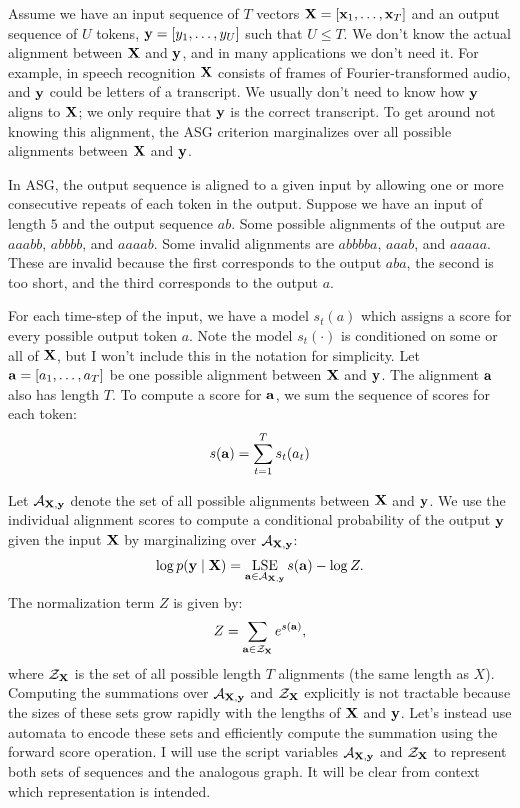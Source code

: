 Assume we have an input sequence of $T$ vectors ${\bf X} = [{\bf x}_1, \ldots, {\bf x}_T]$
and an output sequence of $U$ tokens, ${\bf y} = [y_1, \ldots, y_U]$ such that $U
\le T$. We don't know the actual alignment between ${\bf X}$ and ${\bf y}$, and in many
applications we don't need it. For example, in speech recognition ${\bf X}$
consists of frames of Fourier-transformed audio, and ${\bf y}$ could be letters of
a transcript. We usually don't need to know how ${\bf y}$ aligns to ${\bf X}$; we only
require that ${\bf y}$ is the correct transcript. To get around not knowing this
alignment, the ASG criterion marginalizes over all possible alignments between
${\bf X}$ and ${\bf y}$.

In ASG, the output sequence is aligned to a given input by allowing one or more
consecutive repeats of each token in the output. Suppose we have an input of
length $5$ and the output sequence $ab$. Some possible alignments of the output
are $aaabb$, $abbbb$, and $aaaab$. Some invalid alignments are $abbbba$, $aaab$,
and $aaaaa$. These are invalid because the first corresponds to the output
$aba$, the second is too short, and the third corresponds to the output $a$.

For each time-step of the input, we have a model $s_t(a)$ which assigns a score
for every possible output token $a$. Note the model $s_t(\cdot)$ is conditioned
on some or all of ${\bf X}$, but I won't include this in the notation for
simplicity. Let ${\bf a} = [a_1, \ldots, a_T]$ be one possible alignment between
${\bf X}$ and ${\bf y}$. The alignment ${\bf a}$ also has length $T$. To compute a score
for ${\bf a}$, we sum the sequence of scores for each token:
$$
s({\bf a}) = \sum_{t=1}^T s_t(a_t)
$$

Let $\mathcal{A}_{{\bf X},{\bf y}}$ denote the set of all possible alignments between ${\bf X}$ and
${\bf y}$. We use the individual alignment scores to compute a conditional
probability of the output ${\bf y}$ given the input ${\bf X}$ by marginalizing over
$\mathcal{A}_{{\bf X},{\bf y}}$:
$$
\log p({\bf y} \mid {\bf X}) = \operatorname*{\textrm{LSE}}_{{\bf a} \in \mathcal{A}_{{\bf X}, {\bf y}}} s({\bf a}) - \log Z.
$$
The normalization term $Z$ is given by:
$$
Z = \sum_{{\bf a} \in \mathcal{Z}_{\bf X}} e^{s({\bf a})},
$$
where $\mathcal{Z}_{\bf X}$ is the set of all possible length $T$ alignments (the same
length as $X$). Computing the summations over $\mathcal{A}_{{\bf X},{\bf y}}$ and $\mathcal{Z}_{\bf X}$
explicitly is not tractable because the sizes of these sets grow rapidly with
the lengths of ${\bf X}$ and ${\bf y}$. Let's instead use automata to encode these sets
and efficiently compute the summation using the forward score operation. I will
use the script variables $\mathcal{A}_{{\bf X},{\bf y}}$ and $\mathcal{Z}_{\bf X}$ to represent both sets
of sequences and the analogous graph. It will be clear from context which
representation is intended.

